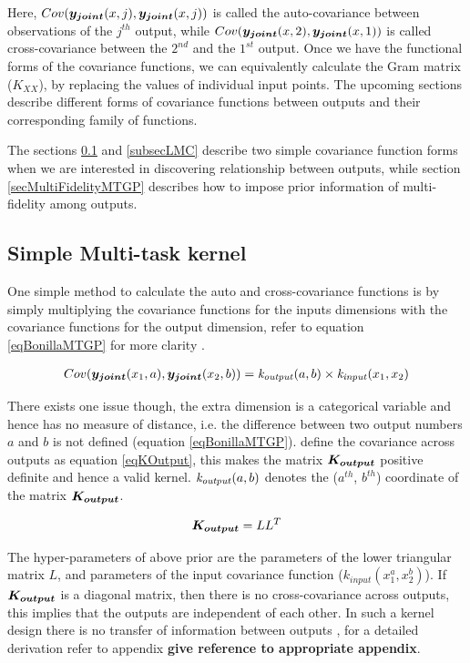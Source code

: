 Here, $Cov(\boldsymbol{y_{joint}}(x, j), \boldsymbol{y_{joint}}(x, j))$ is called the  auto-covariance between observations of the $j^{th}$ output, while $Cov(\boldsymbol{y_{joint}}(x, 2), \boldsymbol{y_{joint}}(x, 1))$ is called cross-covariance between the $2^{nd}$ and the $1^{st}$ output. Once we have the functional forms of the covariance functions, we can equivalently calculate the Gram matrix ($K_{XX}$), by replacing the values of individual input points. The upcoming sections describe different forms of covariance functions between outputs and their corresponding family of functions.

The sections \ref{simpleMultiTask} and \ref{subsecLMC} describe two simple covariance function forms when we are interested in discovering relationship between outputs, while section \ref{secMultiFidelityMTGP} describes how to impose prior information of multi-fidelity among outputs. 

\subsection{Simple Multi-task kernel}\label{simpleMultiTask}

One simple method to calculate the auto and cross-covariance functions is by simply multiplying the covariance functions for the inputs dimensions with the covariance functions for the output dimension, refer to equation \ref{eqBonillaMTGP} for more clarity \cite{bonilla2007multi}.   

\begin{align}\label{eqBonillaMTGP}
    Cov(\boldsymbol{y_{joint}}(x_{1}, a), \boldsymbol{y_{joint}}(x_{2}, b)) = \mathit{k_{output}}(a, b) \times \mathit{k_{input}}(x_{1}, x_{2})
\end{align}

There exists one issue though, the extra dimension is a categorical variable and hence has no measure of distance, i.e. the difference between two output numbers $a$ and $b$ is not defined (equation \ref{eqBonillaMTGP}). \cite{bonilla2007multi} define the covariance across outputs as equation \ref{eqKOutput}, this makes the matrix $\boldsymbol{K_{output}}$ positive definite and hence a valid kernel. $\mathit{k_{output}}(a, b)$ denotes the ($a^{th}$, $b^{th}$) coordinate of the matrix $\boldsymbol{K_{output}}$.

\begin{equation}\label{eqKOutput}
\boldsymbol{K_{output}} = LL^T
\end{equation}

The hyper-parameters of above prior are the parameters of the lower triangular matrix $L$, and parameters of the input  covariance function ($k_{input}(x_{1}^{a}, x_{2}^{b})$). If $\boldsymbol{K_{output}}$ is a diagonal matrix, then there is no cross-covariance across outputs, this implies that the outputs are independent of each other. In such a kernel design there is no transfer of information between outputs \cite{bonilla2007multi, o1998markov}, for a detailed derivation refer to appendix \textbf{give reference to appropriate appendix}.

